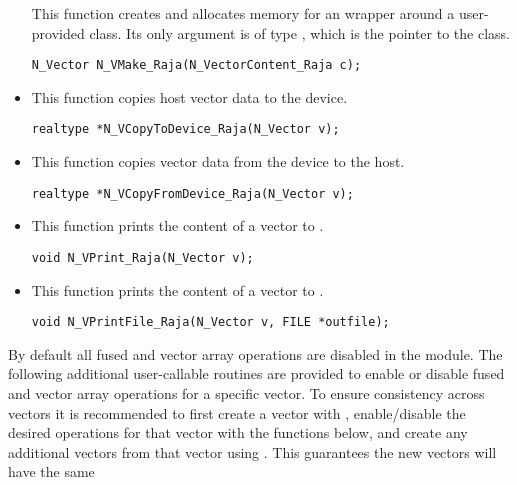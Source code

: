 \begin{itemize}
  This function creates and allocates memory for an {\nvecraja}
  wrapper around a user-provided  class.
  Its only argument is of type , which
  is the pointer to the class.

\begin{verbatim}
N_Vector N_VMake_Raja(N_VectorContent_Raja c);
\end{verbatim}


\item {}

 This function copies host vector data to the device.

 \verb|realtype *N_VCopyToDevice_Raja(N_Vector v);|



\item {}

 This function copies vector data from the device to the host.

 \verb|realtype *N_VCopyFromDevice_Raja(N_Vector v);|



\item {}

  This function prints the content of a {\raja} vector to .

  \verb|void N_VPrint_Raja(N_Vector v);|


\item {}

  This function prints the content of a {\raja} vector to .

  \verb|void N_VPrintFile_Raja(N_Vector v, FILE *outfile);|


\end{itemize}
By default all fused and vector array operations are disabled in the {\nvecraja}
module. The following additional user-callable routines are provided to
enable or disable fused and vector array operations for a specific vector. To
ensure consistency across vectors it is recommended to first create a vector
with , enable/disable the desired operations for that vector
with the functions below, and create any additional vectors from that vector
using . This guarantees the new vectors will have the same
